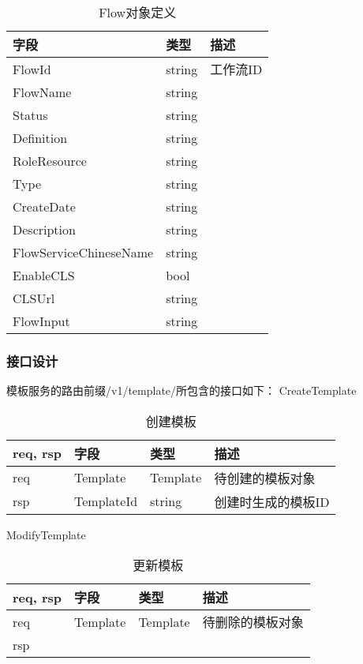 \begin{table}[H]
    \centering
    \caption{Flow对象定义}
    \label{tab:strcut-template}
    \begin{tabular}{lll}
        \toprule
        字段 & 类型 & 描述 \\
        \midrule
        FlowId &       string & 工作流ID \\
        FlowName &       string & \\
        Status &                string & \\
        Definition &            string & \\
        RoleResource &          string & \\
        Type &                  string & \\
        CreateDate &            string & \\
        Description &           string & \\
        FlowServiceChineseName & string & \\
        EnableCLS &             bool & \\
        CLSUrl &                string & \\
        FlowInput &             string & \\
        \bottomrule
    \end{tabular}
\end{table}

\subsubsection{接口设计}

模板服务的路由前缀/v1/template/所包含的接口如下：
CreateTemplate
\begin{table}[H]
    \centering
    \caption{创建模板}
    \label{tab:design-interface-template-create}
    \begin{tabular}{llll}
        \toprule
        req, rsp   & 字段 & 类型 & 描述 \\
        \midrule
        req & Template & Template & 待创建的模板对象 \\ \hline
        rsp & TemplateId & string & 创建时生成的模板ID\\
        \bottomrule
    \end{tabular}
\end{table}

ModifyTemplate
\begin{table}[H]
    \centering
    \caption{更新模板}
    \label{tab:design-interface-template-modify}
    \begin{tabular}{llll}
        \toprule
        req, rsp   & 字段 & 类型 & 描述 \\
        \midrule
        req & Template & Template & 待删除的模板对象 \\ \hline
        rsp & & & \\
        \bottomrule
    \end{tabular}
\end{table}

